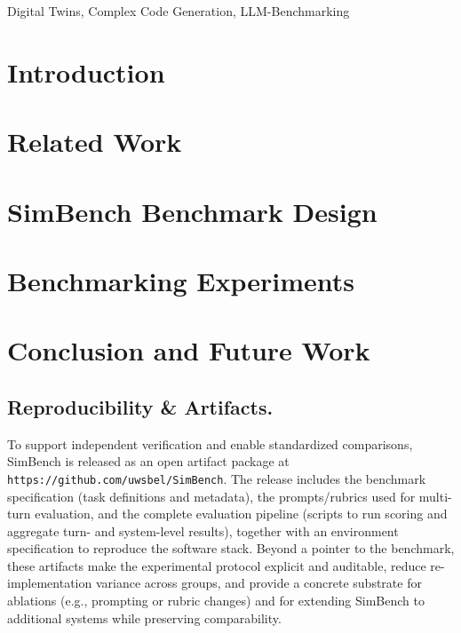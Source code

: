 \documentclass{ieeeaccess}
\begin{document}
\begin{keywords}
    Digital Twins, Complex Code Generation, LLM-Benchmarking\end{keywords}

\titlepgskip=-21pt

\maketitle

\section{Introduction}
\label{sec:introduction}



\section{Related Work}
\label{sec:related}



\section{SimBench Benchmark Design}
\label{sec:simbench}




\section{Benchmarking Experiments}
\label{sec:exp}




\section{Conclusion and Future Work}
\label{sec:conclusion}


\subsection*{Reproducibility \& Artifacts.}
To support independent verification and enable standardized comparisons, SimBench is released as an open artifact package at \texttt{https://github.com/uwsbel/SimBench}. The release includes the benchmark specification (task definitions and metadata), the prompts/rubrics used for multi-turn evaluation, and the complete evaluation pipeline (scripts to run scoring and aggregate turn- and system-level results), together with an environment specification to reproduce the software stack. Beyond a pointer to the benchmark, these artifacts make the experimental protocol explicit and auditable, reduce re-implementation variance across groups, and provide a concrete substrate for ablations (e.g., prompting or rubric changes) and for extending SimBench to additional systems while preserving comparability.
\end{document}
